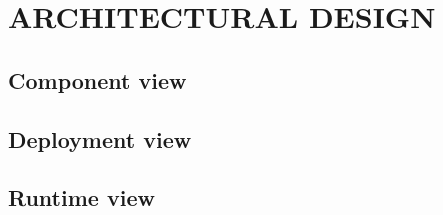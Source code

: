 \section{ARCHITECTURAL DESIGN}

	

	

	\subsection{Component view}

	\subsection{Deployment view}

	\subsection{Runtime view}

	
	
